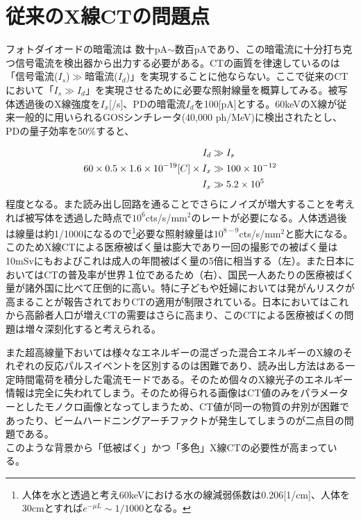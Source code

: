 \section{従来のX線CTの問題点}
フォトダイオードの暗電流は 数十pA$\sim$数百pAであり、この暗電流に十分打ち克つ信号電流を検出器から出力する必要がある。CTの画質を律速しているのは「信号電流($I_s$)$\gg$暗電流($I_d$)」を実現することに他ならない。ここで従来のCTにおいて「$I_s\gg I_d$」を実現させるために必要な照射線量を概算してみる。被写体透過後のX線強度を$I_x$[/s]、PDの暗電流$I_d$を100[pA]とする。60keVのX線が従来一般的に用いられるGOSシンチレータ(40,000 ph/MeV)に検出されたとし、PDの量子効率を50\%すると、

\begin{align}
I_d&\gg I_s\\
60\time40\times0.5\times1.6\times10^{-19} [C] \times I_x&\gg100\times10^{-12}\\
I_x&\gg 5.2\times10^5
\end{align}
程度となる。また読み出し回路を通ることでさらにノイズが増大することを考えれば被写体を透過した時点で$10^{6}$cts/s/mm$^2$のレートが必要になる。人体透過後は線量は約1/1000になるので\footnote{人体を水と透過と考え60keVにおける水の線減弱係数は0.206[1/cm]、人体を30cmとすれば$e^{-\mu L}\sim1/1000$となる。}必要な照射線量は$10^{8-9}$cts/s/mm$^2$と膨大になる。このためX線CTによる医療被ばく量は膨大であり一回の撮影での被ばく量は10mSvにもおよびこれは成人の年間被ばく量の5倍に相当する（左）。また日本においてはCTの普及率が世界１位であるため（右）、国民一人あたりの医療被ばく量が諸外国に比べて圧倒的に高い。特に子どもや妊婦においては発がんリスクが高まることが報告されておりCTの適用が制限されている。日本においてはこれから高齢者人口が増えCTの需要はさらに高まり、このCTによる医療被ばくの問題は増々深刻化すると考えられる。

また超高線量下おいては様々なエネルギーの混ざった混合エネルギーのX線のそれぞれの反応パルスイベントを区別するのは困難であり、読み出し方法はある一定時間電荷を積分した電流モードである。そのため個々のX線光子のエネルギー情報は完全に失われてしまう。そのため得られる画像はCT値のみをパラメーターとしたモノクロ画像となってしまうため、CT値が同一の物質の弁別が困難であったり、ビームハードニングアーチファクトが発生してしまうのが二点目の問題である。\\
このような背景から「低被ばく」かつ「多色」X線CTの必要性が高まっている。


